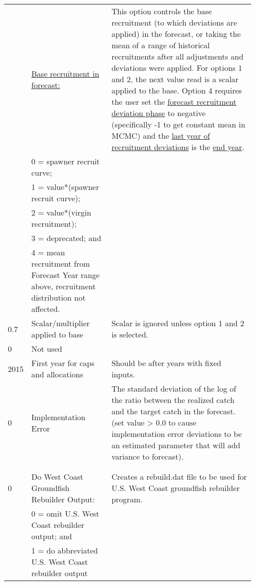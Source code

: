 \begin{landscape}
{\begin{longtable}{p{2cm} p{7cm} p{12cm}}
  \pagebreak
  1 \Tstrut & \hyperlink{ForeSpawn}{Base recruitment in forecast:} \hypertarget{FcastRecruitment}{} & \multirow{1}{1cm}[-0.25cm]{\parbox{12cm}{This option controls the base recruitment (to which deviations are applied) in the forecast, or taking the mean of a range of historical recruitments after all adjustments and deviations were applied. For options 1 and 2, the next value read is a scalar applied to the base. Option 4 requires the user set the \hyperlink{FcastRecDevPhase}{forecast recruitment deviation phase} to negative (specifically -1 to get constant mean in MCMC) and the \hyperlink{RecDevEndYear}{last year of recruitment deviations} is the \hyperlink{EndYear}{end year}.}} \\
    & 0 = spawner recruit curve; & \\
    & 1 = value*(spawner recruit curve); & \\
    & 2 = value*(virgin recruitment); & \\
    & 3 = deprecated; and & \\
    & 4 = mean recruitment from Forecast Year range above, recruitment distribution not affected. & \Bstrut\\

  \hline
  0.7 \Tstrut & Scalar/multiplier applied to base & \multirow{1}{1cm}[-0.05cm]{\parbox{12cm}{Scalar is ignored unless option 1 and 2 is selected.}} \Bstrut\\

  \hline
  0 & Not used & \Tstrut\Bstrut\\
  
  \hline
  2015 \Tstrut & First year for caps and allocations & \multirow{1}{1cm}[-0.10cm]{\parbox{12cm}{Should be after years with fixed inputs.}} \Bstrut\\

  \hline
  0 \Tstrut & Implementation Error & \multirow{1}{1cm}[-0.2cm]{\parbox{12cm}{The standard deviation of the log of the ratio between the realized catch and the target catch in the forecast. (set value > 0.0 to cause implementation error deviations to be an estimated parameter that will add variance to forecast).}} \Bstrut\\
    & & \Bstrut\\
    & & \Bstrut\\

  \hline
  0 \Tstrut & Do West Coast Groundfish Rebuilder Output: &\multirow{1}{1cm}[-0.2cm]{\parbox{12cm}{Creates a rebuild.dat file to be used for U.S. West Coast groundfish rebuilder program.}} \\
    & 0 = omit U.S. West Coast rebuilder output; and & \\
    & 1 = do abbreviated U.S. West Coast rebuilder output \Bstrut\\


\end{longtable}}
\end{landscape}
